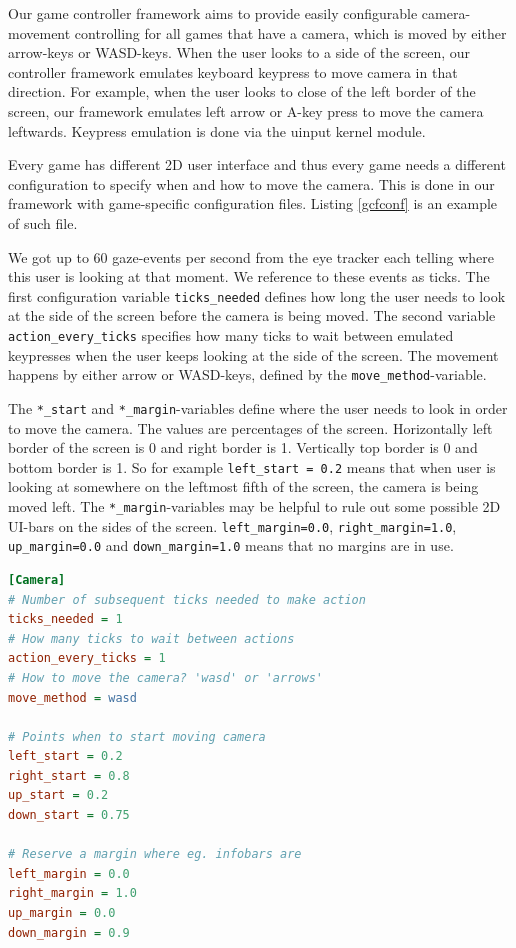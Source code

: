 \documentclass[english]{tktltiki}
\begin{document}
Our game controller framework aims to provide easily configurable camera-movement controlling for all games that have a camera, which is moved by either arrow-keys or WASD-keys. When the user looks to a side of the screen, our controller framework emulates keyboard keypress to move camera in that direction. For example, when the user looks to close of the left border of the screen, our framework emulates left arrow or A-key press to move the camera leftwards. Keypress emulation is done via the uinput kernel module.

Every game has different 2D user interface and thus every game needs a different configuration to specify when and how to move the camera. This is done in our framework with game-specific configuration files. Listing \ref{gcfconf} is an example of such file.

We got up to 60 gaze-events per second from the eye tracker each telling where this user is looking at that moment. We reference to these events as ticks. The first configuration variable \verb|ticks_needed| defines how long the user needs to look at the side of the screen before the camera is being moved. The second variable \verb|action_every_ticks| specifies how many ticks to wait between emulated keypresses when the user keeps looking at the side of the screen. The movement happens by either arrow or WASD-keys, defined by the \verb|move_method|-variable.

The \verb|*_start| and \verb|*_margin|-variables define where the user needs to look in order to move the camera. The values are percentages of the screen. Horizontally left border of the screen is 0 and right border is 1. Vertically top border is 0 and bottom border is 1. So for example \verb|left_start = 0.2| means that when user is looking at somewhere on the leftmost fifth of the screen, the camera is being moved left. The \verb|*_margin|-variables may be helpful to rule out some possible 2D UI-bars on the sides of the screen. \verb|left_margin=0.0|, \verb|right_margin=1.0|, \verb|up_margin=0.0| and \verb|down_margin=1.0| means that no margins are in use.

\bigskip
\begin{lstlisting}[language={Ini},caption={Example of game-specific configuration file},label={gcfconf}]
[Camera]
# Number of subsequent ticks needed to make action
ticks_needed = 1
# How many ticks to wait between actions
action_every_ticks = 1
# How to move the camera? 'wasd' or 'arrows'
move_method = wasd

# Points when to start moving camera
left_start = 0.2
right_start = 0.8
up_start = 0.2
down_start = 0.75

# Reserve a margin where eg. infobars are
left_margin = 0.0
right_margin = 1.0
up_margin = 0.0
down_margin = 0.9
\end{lstlisting}
\bigskip
\end{document}
